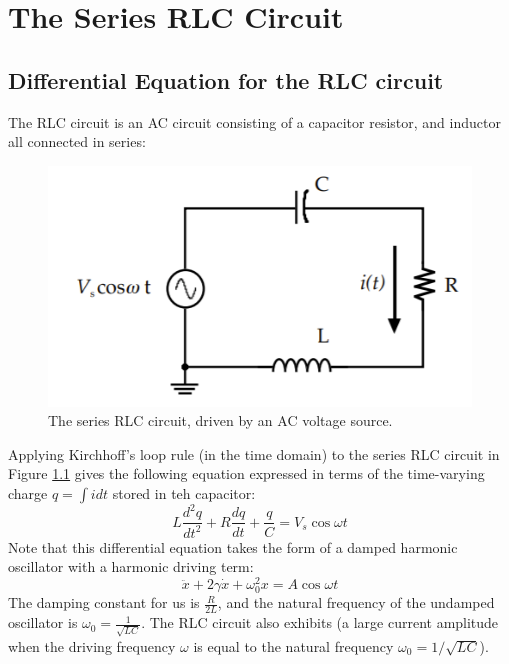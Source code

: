 \documentclass[12pt, a4paper, oneside, openright, titlepage]{book}
\begin{document}
\chapter{The Series RLC Circuit}

\section{Differential Equation for the RLC circuit}

The RLC circuit is an AC circuit consisting of a capacitor resistor, and inductor all connected in series:

\begin{figure}[H]
    \centering
    \includegraphics[scale = 0.8]{Images/RLCCircuit.PNG}
    \caption{The series RLC circuit, driven by an AC voltage source.}
    \label{fig:RLCCircuit}
\end{figure}

Applying Kirchhoff's loop rule (in the time domain) to the series RLC circuit in Figure \ref{fig:RLCCircuit} gives the following equation expressed in terms of the time-varying charge $q = \int idt$ stored in teh capacitor: \begin{equation*}
    L\frac{d^2q}{dt^2} + R\frac{dq}{dt} + \frac{q}{C} = V_s\cos\omega t
\end{equation*}
Note that this differential equation takes the form of a damped harmonic oscillator with a harmonic driving term: \begin{equation*}
    \ddot{x} + 2\gamma\dot{x} + \omega_0^2x = A\cos\omega t
\end{equation*}
The damping constant for us is $\frac{R}{2L}$, and the natural frequency of the undamped oscillator is $\omega_0 = \frac{1}{\sqrt{LC}}$. The RLC circuit also exhibits  (a large current amplitude when the driving frequency $\omega$ is equal to the natural frequency $\omega_0 = 1/\sqrt{LC}$).
\end{document}
